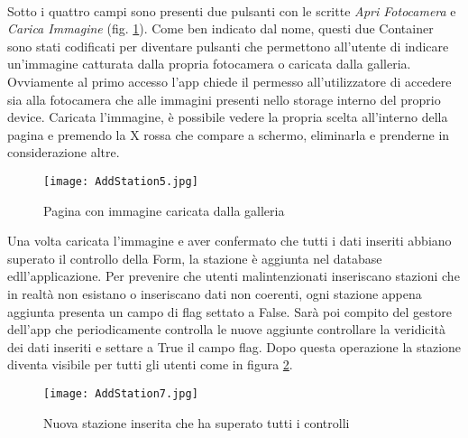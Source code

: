 \\
Sotto i quattro campi sono presenti due pulsanti con le scritte \textit{Apri
Fotocamera} e \textit{Carica Immagine} (fig. \ref{addStation5}). Come ben indicato dal nome, questi due
Container sono stati codificati per diventare pulsanti che permettono
all'utente di indicare un'immagine catturata dalla propria fotocamera o caricata
dalla galleria. Ovviamente al primo accesso l'app chiede il permesso
all'utilizzatore di accedere sia alla fotocamera che alle immagini presenti nello storage
interno del proprio device. Caricata l'immagine, è possibile vedere la propria
scelta all'interno della pagina e premendo la X rossa che compare a schermo,
eliminarla e prenderne in considerazione altre.
\begin{figure}[!h]
    \centering
    \texttt{[image: AddStation5.jpg]}
    \caption{Pagina con immagine caricata dalla galleria}
    \label{addStation5}
\end{figure}
Una volta caricata l'immagine e aver confermato che tutti i dati inseriti
abbiano superato il controllo della Form, la stazione è aggiunta nel database
edll'applicazione. Per prevenire che utenti malintenzionati inseriscano stazioni
che in realtà non esistano o inseriscano dati non coerenti, ogni stazione appena
aggiunta presenta un campo di flag settato a False. Sarà poi compito del gestore
dell'app che periodicamente controlla le nuove aggiunte controllare la
veridicità dei dati inseriti e settare a True il campo flag. Dopo questa
operazione la stazione diventa visibile per tutti gli utenti come in figura
\ref{addStation7}.
\begin{figure}[!h]
    \centering
    \texttt{[image: AddStation7.jpg]}
    \caption{Nuova stazione inserita che ha superato tutti i controlli}
    \label{addStation7}
\end{figure}
